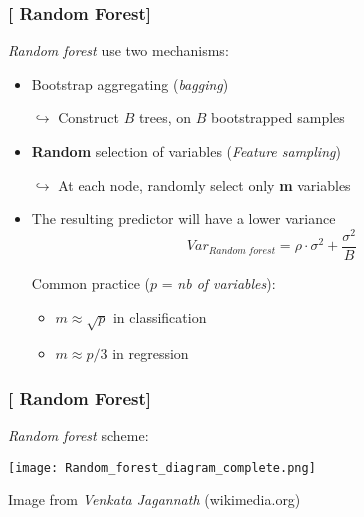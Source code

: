 \documentclass[xcolor=x11names,compress, handhouts]{beamer}
\renewcommand{\(}{\begin{columns}}
\renewcommand{\)}{\end{columns}}
\newcommand{\<}[1]{\begin{column}{#1}}
\renewcommand{\>}{\end{column}}
\begin{document}
\begin{frame}
\frametitle{\textcolor{brique}{[ Random Forest]}}
\textit{Random forest} use two mechanisms:
\pause
\begin{itemize}[<+->]
    \item Bootstrap aggregating (\textit{bagging})
    \item[$\hookrightarrow$] Construct $B$ trees, on $B$ bootstrapped samples
    \item \textbf{Random} selection of variables (\textit{Feature sampling})
    \item[$\hookrightarrow$] At each node, randomly select only \textbf{m} variables
    \item The resulting predictor will have a lower variance
    $$
Var_{Random \; forest} = \rho \cdot \sigma^{2} + \frac{\sigma^{2}}{B}
$$

    \item[]Common practice ($p$ =\textit{ nb of variables}):
    \begin{itemize}
        \item $m \approx \sqrt{p}$ in classification
        \item $m \approx p/3$ in regression
    \end{itemize}
\end{itemize}
\end{frame}


\begin{frame}
\frametitle{\textcolor{brique}{[ Random Forest]}}
\textit{Random forest} scheme:
\begin{center}
\texttt{[image: Random\_forest\_diagram\_complete.png]}\\
\end{center}
 \textcolor{gris}{\small Image from  \textit{Venkata Jagannath} (wikimedia.org) }
\end{frame}
\end{document}
